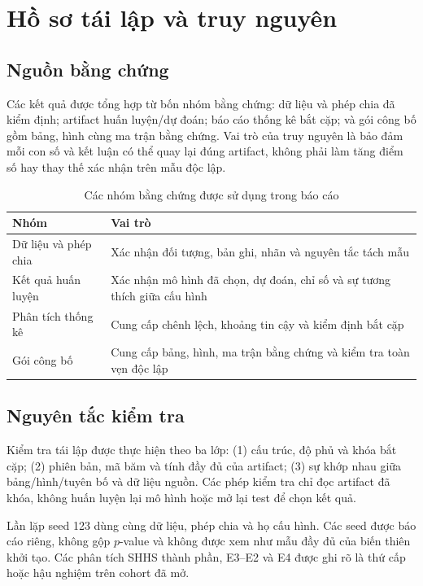 \section{Hồ sơ tái lập và truy nguyên}
\label{sec:reproducibility}

\subsection{Nguồn bằng chứng}

Các kết quả được tổng hợp từ bốn nhóm bằng chứng: dữ liệu và phép chia đã kiểm định; artifact huấn luyện/dự đoán; báo cáo thống kê bắt cặp; và gói công bố gồm bảng, hình cùng ma trận bằng chứng. Vai trò của truy nguyên là bảo đảm mỗi con số và kết luận có thể quay lại đúng artifact, không phải làm tăng điểm số hay thay thế xác nhận trên mẫu độc lập.

\begin{table}[H]
\centering
\caption{Các nhóm bằng chứng được sử dụng trong báo cáo}
\label{tab:reproducibility_evidence}
\begin{tabularx}{\textwidth}{lY}
\toprule
\textbf{Nhóm} & \textbf{Vai trò} \\
\midrule
Dữ liệu và phép chia & Xác nhận đối tượng, bản ghi, nhãn và nguyên tắc tách mẫu \\
Kết quả huấn luyện & Xác nhận mô hình đã chọn, dự đoán, chỉ số và sự tương thích giữa cấu hình \\
Phân tích thống kê & Cung cấp chênh lệch, khoảng tin cậy và kiểm định bắt cặp \\
Gói công bố & Cung cấp bảng, hình, ma trận bằng chứng và kiểm tra toàn vẹn độc lập \\
\bottomrule
\end{tabularx}
\end{table}

\subsection{Nguyên tắc kiểm tra}

Kiểm tra tái lập được thực hiện theo ba lớp: (1) cấu trúc, độ phủ và khóa bắt cặp; (2) phiên bản, mã băm và tính đầy đủ của artifact; (3) sự khớp nhau giữa bảng/hình/tuyên bố và dữ liệu nguồn. Các phép kiểm tra chỉ đọc artifact đã khóa, không huấn luyện lại mô hình hoặc mở lại test để chọn kết quả.

Lần lặp seed 123 dùng cùng dữ liệu, phép chia và họ cấu hình. Các seed được báo cáo riêng, không gộp $p$-value và không được xem như mẫu đầy đủ của biến thiên khởi tạo. Các phân tích SHHS thành phần, E3--E2 và E4 được ghi rõ là thứ cấp hoặc hậu nghiệm trên cohort đã mở.

